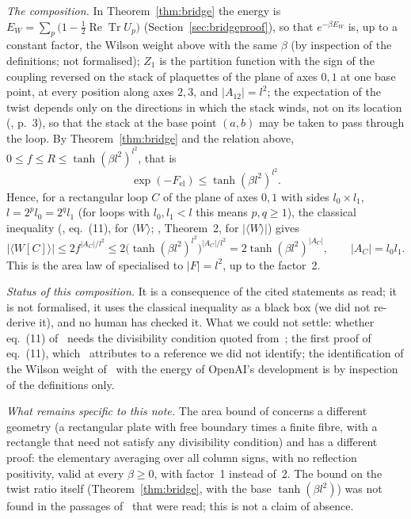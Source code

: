 \documentclass[11pt,a4paper]{article}
\theoremstyle{plain}
\theoremstyle{definition}
\theoremstyle{remark}
\numberwithin{equation}{section}
\newcommand{\lean}[1]{\texttt{\expandafter\leanbk\detokenize{#1}\relax}}
\def\leanbk#1{\ifx#1\relax\else\ifx#1.#1\allowbreak\else\ifx#1_#1\allowbreak\else#1\fi\fi\expandafter\leanbk\fi}
\begin{document}
\emph{The composition.} In Theorem~\ref{thm:bridge} the energy is $E_W=\sum_p\bigl(1-\frac12\operatorname{Re}\operatorname{Tr}U_p\bigr)$ (Section~\ref{sec:bridgeproof}), so that $e^{-\beta E_W}$ is, up to a constant factor, the Wilson weight above with the same $\beta$ (by inspection of the definitions; not formalised); $Z_1$ is the partition function with the sign of the coupling reversed on the stack of plaquettes of the plane of axes $0,1$ at one base point, at every position along axes $2,3$, and $|A_{12}|=l^2$; the expectation of the twist depends only on the directions in which the stack winds, not on its location (\cite{KT02}, p.~3), so that the stack at the base point $(a,b)$ may be taken to pass through the loop. By Theorem~\ref{thm:bridge} and the relation above, $0\le f\le R\le\tanh(\beta l^2)^{l^2}$, that is
\[
\exp(-F_{\mathrm{el}})\le\tanh(\beta l^2)^{l^2}.
\]
Hence, for a rectangular loop $C$ of the plane of axes $0,1$ with sides $l_0\times l_1$, $l=2^pl_0=2^ql_1$ (for loops with $l_0,l_1<l$ this means $p,q\ge1$), the classical inequality (\cite{KT02}, eq.~(11), for $\langle W\rangle$; \cite{Kan}, Theorem~2, for $|\langle W\rangle|$) gives
\[
|\langle W[C]\rangle|\le2f^{|A_C|/l^2}\le2\bigl(\tanh(\beta l^2)^{l^2}\bigr)^{|A_C|/l^2}=2\tanh(\beta l^2)^{|A_C|},\qquad|A_C|=l_0l_1 .
\]
This is the area law of \lean{tube_area_law_rectangle} specialised to $|F|=l^2$, up to the factor~2.

\emph{Status of this composition.} It is a consequence of the cited statements as read; it is not formalised, it uses the classical inequality as a black box (we did not re-derive it), and no human has checked it. What we could not settle: whether eq.~(11) of~\cite{KT02} needs the divisibility condition quoted from~\cite{Kan}; the first proof of eq.~(11), which~\cite{KT02} attributes to a reference we did not identify; the identification of the Wilson weight of~\cite{KT02,Kan} with the energy of OpenAI's development is by inspection of the definitions only.

\emph{What remains specific to this note.} The area bound of \lean{tube_area_law_rectangle} concerns a different geometry (a rectangular plate with free boundary times a finite fibre, with a rectangle that need not satisfy any divisibility condition) and has a different proof: the elementary averaging over all column signs, with no reflection positivity, valid at every $\beta\ge0$, with factor~1 instead of~2. The bound on the twist ratio itself (Theorem~\ref{thm:bridge}, with the base $\tanh(\beta l^2)$) was not found in the passages of~\cite{TY85,KT02,Kan,BS83} that were read; this is not a claim of absence.
\end{document}
